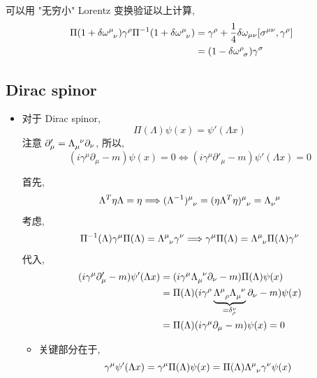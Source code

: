 \begin{itemize}
\begin{tcolorbox}[title=calculation:]
		\noindent\hdashrule[0.5ex]{\linewidth}{0.5pt}{1mm} %
		
		可以用 "无穷小" Lorentz 变换验证以上计算,
		\begin{align}
			\Pi(1 + \delta \tensor{\omega}{^\mu_\nu}) \gamma^\rho \Pi^{- 1}(1 + \delta \tensor{\omega}{^\mu_\nu}) &= \gamma^\rho + \frac{1}{4} \delta \omega_{\mu \nu} [\sigma^{\mu \nu}, \gamma^\rho] \notag \\
			&= (1 - \delta \tensor{\omega}{^\rho_\sigma}) \gamma^\sigma
		\end{align}
	\end{tcolorbox}
\end{itemize}

\subsection{Dirac spinor}
\begin{itemize}
	\item 对于 Dirac spinor,
	\begin{equation}
		\Pi(\Lambda) \psi(x) = \psi'(\Lambda x)
	\end{equation}
	注意 $\partial'_\mu = \tensor{\Lambda}{_\mu^\nu} \partial_\nu$, 所以,
	\begin{equation}
		(i \gamma^\mu \partial_\mu - m) \psi(x) = 0 \iff (i \gamma^\mu \partial'_\mu - m) \psi'(\Lambda x) = 0
	\end{equation}
	
	\begin{tcolorbox}[title=calculation:]
		首先,
		\begin{equation}
			\Lambda^T \eta \Lambda = \eta \Longrightarrow \tensor{(\Lambda^{- 1})}{^\mu_\nu} = \tensor{(\eta \Lambda^T \eta)}{^\mu_\nu} = \tensor{\Lambda}{_\nu^\mu}
		\end{equation}
		考虑,
		\begin{equation}
			\Pi^{- 1}(\Lambda) \gamma^\mu \Pi(\Lambda) = \tensor{\Lambda}{^\mu_\nu} \gamma^\nu \Longrightarrow \gamma^\mu \Pi(\Lambda) = \tensor{\Lambda}{^\mu_\nu} \Pi(\Lambda) \gamma^\nu
		\end{equation}
		代入,
		\begin{align}
			(i \gamma^\mu \partial'_\mu - m) \psi'(\Lambda x) &= (i \gamma^\mu \tensor{\Lambda}{_\mu^\nu} \partial_\nu - m) \Pi(\Lambda) \psi(x) \notag \\
			&= \Pi(\Lambda) (i \gamma^\rho \underbrace{\tensor{\Lambda}{^\mu_\rho} \tensor{\Lambda}{_\mu^\nu}}_{= \delta^\nu_\rho} \partial_\nu - m) \psi(x) \notag \\
			&= \Pi(\Lambda) (i \gamma^\mu \partial_\mu - m) \psi(x) = 0
		\end{align}
	\end{tcolorbox}
	\begin{itemize}
		\item 关键部分在于,
		\begin{equation}
			\gamma^\mu \psi'(\Lambda x) = \gamma^\mu \Pi(\Lambda) \psi(x) = \Pi(\Lambda) \tensor{\Lambda}{^\mu_\nu} \gamma^\nu \psi(x)
		\end{equation}
	\end{itemize}
\end{itemize}

